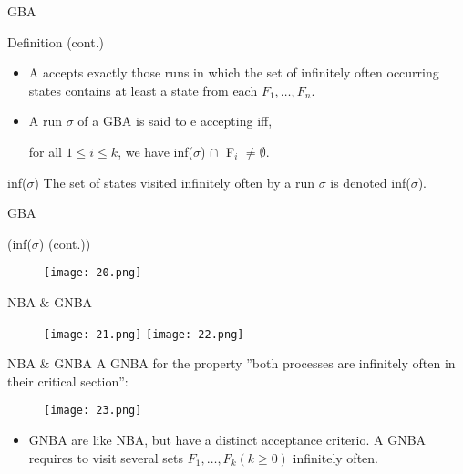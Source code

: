 \documentclass[17pt, t, lualatex]{beamer}
\begin{document}
\begin{frame}{GBA}
\begin{block}{Definition (cont.)}
    \begin{itemize}
        \item A accepts exactly those runs in which the set of infinitely often occurring states contains at least a state from each $F_1,\ldots,F_n$.
        \item A run $\sigma$ of a GBA is said to e accepting iff,
        \begin{center}
            for all $1\leq i \leq k$, we have inf($\sigma$) $\cap\;$ F$_i$ $\neq \emptyset$.
        \end{center}
    \end{itemize}
    \begin{block}{inf($\sigma$)}
        The set of states visited infinitely often by a run $\sigma$ is denoted inf($\sigma$).
    \end{block}
\end{block}
\end{frame}

\begin{frame}{GBA}
\begin{block}{(inf($\sigma$) (cont.))}
    \begin{figure}
        \centering
        \texttt{[image: 20.png]}
    \end{figure}
\end{block}
\end{frame}

\begin{frame}{NBA $\&$ GNBA}
    \begin{figure}
        \centering
        \texttt{[image: 21.png]}
        \texttt{[image: 22.png]}
    \end{figure}
\end{frame}

\begin{frame}{NBA $\&$ GNBA}
    A GNBA for the property ”both processes are infinitely often in their critical section”:
    \begin{figure}
        \centering
        \texttt{[image: 23.png]}
    \end{figure}
    \begin{itemize}
        \item GNBA are like NBA, but have a distinct acceptance criterio. A GNBA requires to visit several sets $F_1, \ldots, F_k (k \geq 0)$ infinitely often.
    \end{itemize}
\end{frame}
\end{document}
